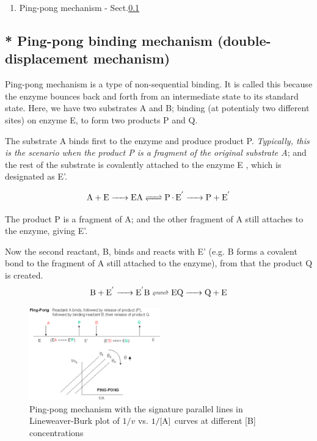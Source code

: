 \begin{enumerate}
  \item Ping-pong mechanism - Sect.\ref{sec:ping-pong-mechanism}
\end{enumerate}

\subsection{* Ping-pong binding mechanism (double-displacement mechanism)}
\label{sec:ping-pong-mechanism}

Ping-pong mechanism is a type of non-sequential binding. 
It is called this because the enzyme bounces back and forth from an intermediate
state to its standard state. Here, we have two substrates A and B; binding 
(at potentialy two different sites) on enzyme E, to form two products P and Q.

The substrate A binds first to the enzyme and produce product P.
{\it Typically, this is the scenario when the product P is a fragment of the
original substrate A}; and the rest of the substrate is covalently attached to
the enzyme E , which is designated as E'.

\begin{equation}
\ce{A + E -> EA <=> P.E^' -> P + E^'}
\end{equation}

The product P is a fragment of A; and the other fragment of A still
attaches to the enzyme, giving E'.

Now the second reactant, B, binds and reacts with E' (e.g. B forms a covalent
bond to the fragment of A still attached to the enzyme), from that the
product Q is created.
\begin{equation}
\ce{B + E^' -> E^'B <=> EQ -> Q + E}
\end{equation}

\begin{figure}[htb]
  \centerline{\includegraphics[height=4cm]{./images/pingpong-mechanism.eps}}
  \caption{Ping-pong mechanism with the signature
  parallel lines in Lineweaver-Burk plot of $1/v$
  vs. $1/\ce{[A]}$ curves at different [B]
  concentrations}\label{fig:pingpong-mechanism}
\end{figure}

